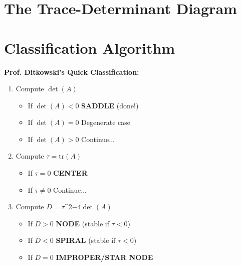 \documentclass[12pt]{article}
\begin{document}
\section{The Trace-Determinant Diagram}

\begin{center}
\end{center}

\section{Classification Algorithm}

\begin{quickcheck}
\textbf{Prof. Ditkowski's Quick Classification:}
\begin{enumerate}
    \item Compute $\det(A)$
    \begin{itemize}
        \item If $\det(A) < 0$ \rightarrow \textbf{SADDLE} (done!)
        \item If $\det(A) = 0$ \rightarrow Degenerate case
        \item If $\det(A) > 0$ \rightarrow Continue...
    \end{itemize}
    \item Compute $\tau = \text{tr}(A)$
    \begin{itemize}
        \item If $\tau = 0$ \rightarrow \textbf{CENTER}
        \item If $\tau \neq 0$ \rightarrow Continue...
    \end{itemize}
    \item Compute $D = \tau$^{2}$ - 4\det(A)$
    \begin{itemize}
        \item If $D > 0$ \rightarrow \textbf{NODE} (stable if $\tau < 0$)
        \item If $D < 0$ \rightarrow \textbf{SPIRAL} (stable if $\tau < 0$)
        \item If $D = 0$ \rightarrow \textbf{IMPROPER/STAR NODE}
    \end{itemize}
\end{enumerate}
\end{quickcheck}
\end{document}
